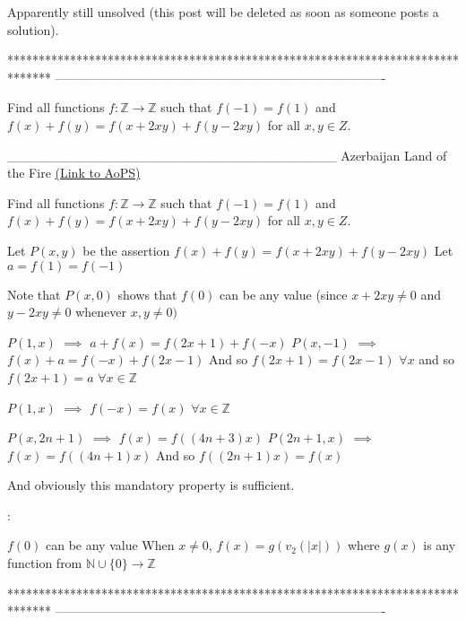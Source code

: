 \begin{solution}
	Apparently still unsolved (this post will be deleted as soon as someone posts a solution).
\end{solution}
*******************************************************************************
-------------------------------------------------------------------------------

\begin{problem}
	Find all functions $f: \mathbb{Z}\to\mathbb{Z}$ such that $f(-1)=f(1)$ and $f(x)+f(y)=f(x+2xy)+f(y-2xy)$ for all $x,y{\in}Z$.

___________________________________
Azerbaijan Land of the Fire 
	\flushright \href{https://artofproblemsolving.com/community/c6h544699}{(Link to AoPS)}
\end{problem}



\begin{solution}
	\begin{tcolorbox}Find all functions $f: \mathbb{Z}\to\mathbb{Z}$ such that $f(-1)=f(1)$ and $f(x)+f(y)=f(x+2xy)+f(y-2xy)$ for all $x,y{\in}Z$.\end{tcolorbox}
Let $P(x,y)$ be the assertion $f(x)+f(y)=f(x+2xy)+f(y-2xy)$
Let $a=f(1)=f(-1)$

Note that $P(x,0)$ shows that $f(0)$ can be any value (since $x+2xy\ne 0$ and $y-2xy\ne 0$ whenever $x,y\ne 0)$

$P(1,x)$ $\implies$ $a+f(x)=f(2x+1)+f(-x)$
$P(x,-1)$ $\implies$ $f(x)+a=f(-x)+f(2x-1)$
And so $f(2x+1)=f(2x-1)$ $\forall x$ and so $f(2x+1)=a$ $\forall x\in\mathbb Z$

$P(1,x)$ $\implies$ $f(-x)=f(x)$ $\forall x\in\mathbb Z$

$P(x,2n+1)$ $\implies$ $f(x)=f((4n+3)x)$
$P(2n+1,x)$ $\implies$ $f(x)=f((4n+1)x)$
And so $f((2n+1)x)=f(x)$

And obviously this mandatory property is sufficient.

 : 

$f(0)$ can be any value
When $x\ne 0$, $f(x)=g(v_2(|x|))$ where $g(x)$ is any function from $\mathbb N\cup\{0\}\to\mathbb Z$
\end{solution}
*******************************************************************************
-------------------------------------------------------------------------------

